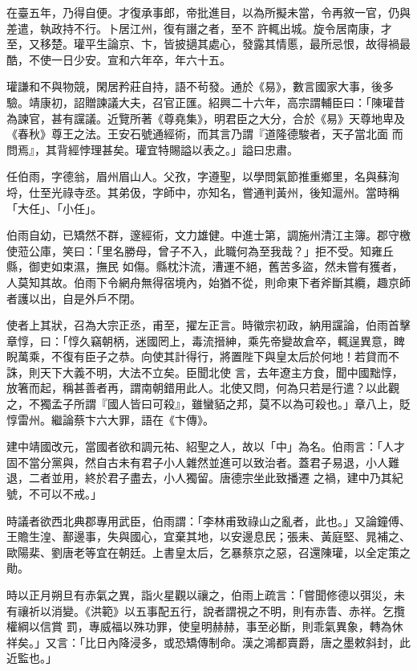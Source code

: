 \begin{pinyinscope}
 在臺五年，乃得自便。才復承事郎，帝批進目，以為所擬未當，令再敘一官，仍與差遣，執政持不行。卜居江州，復有譖之者，至不
 許輒出城。旋令居南康，才至，又移楚。瓘平生論京、卞，皆披擿其處心，發露其情慝，最所忌恨，故得禍最酷，不使一日少安。宣和六年卒，年六十五。



 瓘謙和不與物競，閑居矜莊自持，語不茍發。通於《易》，數言國家大事，後多驗。靖康初，詔贈諫議大夫，召官正匯。紹興二十六年，高宗謂輔臣曰：「陳瓘昔為諫官，甚有讜議。近覽所著《尊堯集》，明君臣之大分，合於《易》天尊地卑及《春秋》尊王之法。王安石號通經術，而其言乃謂『道隆德駿者，天子當北面
 而問焉』，其背經悖理甚矣。瓘宜特賜謚以表之。」謚曰忠肅。



 任伯雨，字德翁，眉州眉山人。父孜，字遵聖，以學問氣節推重鄉里，名與蘇洵埒，仕至光祿寺丞。其弟伋，字師中，亦知名，嘗通判黃州，後知滬州。當時稱「大任」、「小任」。



 伯雨自幼，已矯然不群，邃經術，文力雄健。中進士第，調施州清江主簿。郡守檄使蒞公庫，笑曰：「里名勝母，曾子不入，此職何為至我哉？」拒不受。知雍丘縣，御吏如束濕，撫民
 如傷。縣枕汴流，漕運不絕，舊苦多盜，然未嘗有獲者，人莫知其故。伯雨下令網舟無得宿境內，始猶不從，則命東下者斧斷其纜，趣京師者護以出，自是外戶不閉。



 使者上其狀，召為大宗正丞，甫至，擢左正言。時徽宗初政，納用讜論，伯雨首擊章惇，曰：「惇久竊朝柄，迷國罔上，毒流搢紳，乘先帝變故倉卒，輒逞異意，睥睨萬乘，不復有臣子之恭。向使其計得行，將置陛下與皇太后於何地！若貸而不誅，則天下大義不明，大法不立矣。臣聞北使
 言，去年遼主方食，聞中國黜惇，放箸而起，稱甚善者再，謂南朝錯用此人。北使又問，何為只若是行遣？以此觀之，不獨孟子所謂『國人皆曰可殺』，雖蠻貊之邦，莫不以為可殺也。」章八上，貶惇雷州。繼論蔡卞六大罪，語在《卞傳》。



 建中靖國改元，當國者欲和調元祐、紹聖之人，故以「中」為名。伯雨言：「人才固不當分黨與，然自古未有君子小人雜然並進可以致治者。蓋君子易退，小人難退，二者並用，終於君子盡去，小人獨留。唐德宗坐此致播遷
 之禍，建中乃其紀號，不可以不戒。」



 時議者欲西北典郡專用武臣，伯雨謂：「李林甫致祿山之亂者，此也。」又論鐘傅、王贍生湟、鄯邊事，失與國心，宜棄其地，以安邊息民；張耒、黃庭堅、晁補之、歐陽棐、劉唐老等宜在朝廷。上書皇太后，乞暴蔡京之惡，召還陳瓘，以全定策之勛。



 時以正月朔旦有赤氣之異，詣火星觀以禳之，伯雨上疏言：「嘗聞修德以弭災，未有禳祈以消變。《洪範》以五事配五行，說者謂視之不明，則有赤眚、赤祥。乞攬權綱以信賞
 罰，專威福以殊功罪，使皇明赫赫，事至必斷，則乖氣異象，轉為休祥矣。」又言：「比日內降浸多，或恐矯傳制命。漢之鴻都賣爵，唐之墨敕斜封，此近監也。」




\end{pinyinscope}
